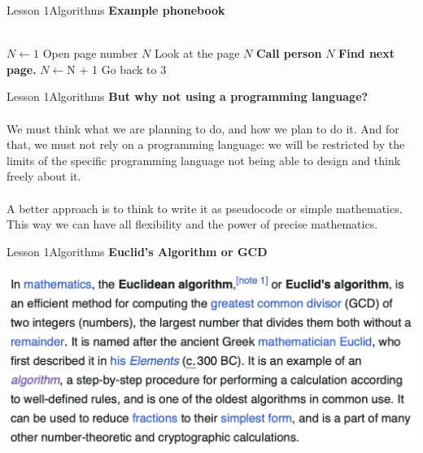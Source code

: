 \documentclass[aspectratio=1610]{beamer}
\begin{document}
\begin{frame}{Lesson 1}{Algorithms}
\Large
\textbf{Example phonebook}\\~\\

\label{phonebook}

\begin{algorithmic}[1]

\State $N\gets 1$
\State Open page number $N$
\State Look at the page $N$
    \State \textbf{Call person} $N$
\Else \State \textbf{Find next page.} {$N\gets $N + 1} Go back to 3 
\EndIf
\EndProcedure
\end{algorithmic}
\end{frame}



\begin{frame}{Lesson 1}{Algorithms}
\Large
\textbf{But why not using a programming language?}\\~\\ 
We must think what we are planning to do, and how we plan to do it. And for that, we must not rely on a programming language: we will be restricted by the limits of the specific programming language not being able to design and think freely about it.\\~\\
A better approach is to think to write it as pseudocode or simple mathematics. This way we can have all flexibility and the power of precise mathematics.
\end{frame}



\begin{frame}{Lesson 1}{Algorithms}
\Large
\textbf{Euclid's Algorithm or GCD}\\~\\ 
\includegraphics[scale=0.7]{Images/gcd}
\end{frame}
\end{document}
